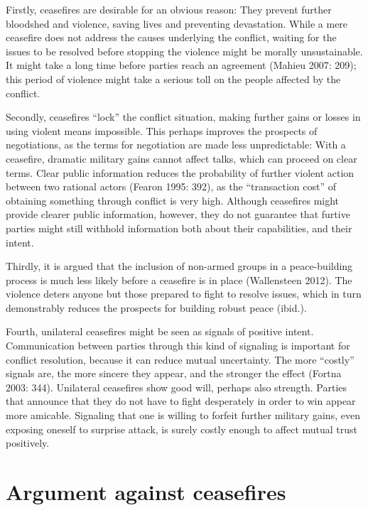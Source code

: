 \documentclass[12pt,twoside]{reedthesis}
\begin{document}
Firstly, ceasefires are desirable for an obvious reason: They prevent
further bloodshed and violence, saving lives and preventing devastation.
While a mere ceasefire does not address the causes underlying the
conflict, waiting for the issues to be resolved before stopping the
violence might be morally unsustainable. It might take a long time
before parties reach an agreement (Mahieu 2007: 209); this period of
violence might take a serious toll on the people affected by the
conflict.

Secondly, ceasefires ``lock'' the conflict situation, making further
gains or losses in using violent means impossible. This perhaps improves
the prospects of negotiations, as the terms for negotiation are made
less unpredictable: With a ceasefire, dramatic military gains cannot
affect talks, which can proceed on clear terms. Clear public information
reduces the probability of further violent action between two rational
actors (Fearon 1995: 392), as the ``transaction cost'' of obtaining
something through conflict is very high. Although ceasefires might
provide clearer public information, however, they do not guarantee that
furtive parties might still withhold information both about their
capabilities, and their intent.

Thirdly, it is argued that the inclusion of non-armed groups in a
peace-building process is much less likely before a ceasefire is in
place (Wallensteen 2012). The violence deters anyone but those prepared
to fight to resolve issues, which in turn demonstrably reduces the
prospects for building robust peace (ibid.).

Fourth, unilateral ceasefires might be seen as signals of positive
intent. Communication between parties through this kind of signaling is
important for conflict resolution, because it can reduce mutual
uncertainty. The more ``costly'' signals are, the more sincere they
appear, and the stronger the effect (Fortna 2003: 344). Unilateral
ceasefires show good will, perhaps also strength. Parties that announce
that they do not have to fight desperately in order to win appear more
amicable. Signaling that one is willing to forfeit further military
gains, even exposing oneself to surprise attack, is surely costly enough
to affect mutual trust positively.

\section{Argument against ceasefires}\label{argument-against-ceasefires}
\end{document}

